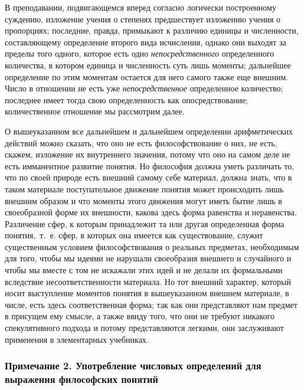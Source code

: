 В преподавании, подвигающемся вперед согласно логически построенному
суждению, изложение учения о степенях предшествует изложению учения о
пропорциях; последние, правда, примыкают к различию единицы и численности,
составляющему определение второго вида исчисления, однако они выходят за
пределы того одного, которое есть одно
{\em непосредственного} определенного количества, в
котором единица и численность суть лишь моменты; дальнейшее определение по
этим моментам остается для него
самого также еще внешним. Число в отношении не есть уже
{\em непосредственное} определенное количество;
последнее имеет тогда свою определенность как опосредствование;
количественное отношение мы рассмотрим
далее.

О вышеуказанном все дальнейшем и дальнейшем определении арифметических
действий можно сказать, что оно не есть философствование о них, не есть,
скажем, изложение их внутреннего значения, потому что оно на самом деле не
есть имманентное развитие понятия. Но философия должна уметь различать то,
что по своей природе есть внешний самому себе материал, должна знать, что в
таком материале поступательное движение понятия может происходить лишь
внешним образом и что моменты этого движения могут иметь бытие лишь в
своеобразной форме их внешности, какова здесь форма равенства и
неравенства. Различение сфер, к которым принадлежит та или другая
определенная форма понятия,~т.~е. сфер, в которых она имеется как
существование, служит существенным условием философствования о реальных
предметах, необходимым для того, чтобы мы идеями не нарушали своеобразия
внешнего и случайного и чтобы мы вместе с том не искажали этих идей и не
делали их формальными вследствие несоответственности материала. Но тот
внешний характер, который носит выступление моментов понятия в
вышеуказанном внешнем материале, в числе, есть здесь соответственная форма;
так как они представляют нам предмет в присущем ему смысле, а также ввиду
того, что они не требуют никакого спекулятивного подхода и потому
представляются легкими, они заслуживают применения в элементарных
учебниках.

\subsubsection[Примечание 2. Употребление числовых определений для выражения философских понятий]
{Примечание 2. Употребление числовых определений для выражения философских понятий}

